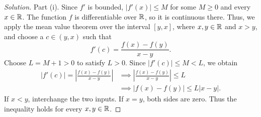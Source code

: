 \begin{proof}[Solution]
  Part (i). Since $f'$ is bounded, $|f'(x)|\le M$
  for some $M\ge0$
  and every $x\in\mathbb{R}$.
  The function $f$ is differentiable over $\mathbb{R}$, so
  it is continuous there.
  Thus, we apply the mean value theorem over the interval $[y,x]$,
  where $x,y\in\mathbb{R}$ and $x>y$, and choose a $c\in(y,x)$ such that
  \[
    f'(c)=\frac{f(x)-f(y)}{x-y}.
  \]
  Choose $L=M+1>0$ to satisfy $L>0$.
  Since $|f'(c)|\le M<L$, we obtain
  \[
    \begin{aligned}
      |f'(c)|=\left|\frac{f(x)-f(y)}{x-y}\right|
        &\implies \left|\frac{f(x)-f(y)}{x-y}\right|\le L\\
        &\implies |f(x)-f(y)|\le L|x-y|.
    \end{aligned}
  \]
  If $x<y$, interchange the two inputs. If $x=y$,
  both sides are zero. Thus the inequality holds for every
  $x,y\in\mathbb{R}$.


\end{proof}
